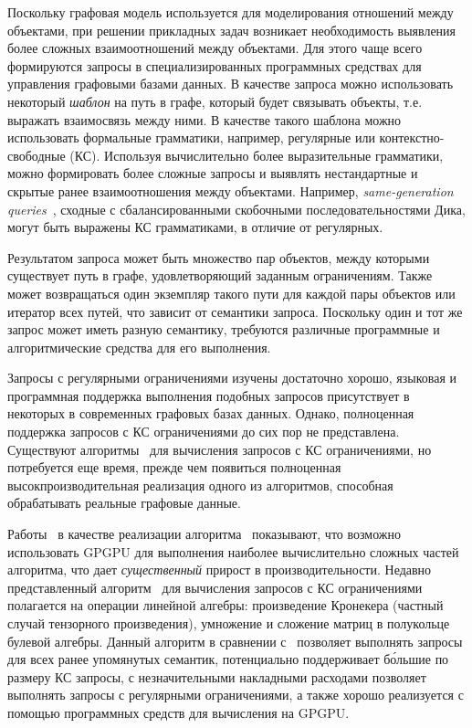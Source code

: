 \documentclass[14pt]{matmex-diploma-custom}
\begin{document}
Поскольку графовая модель используется для моделирования отношений между объектами, при решении прикладных задач возникает необходимость выявления более сложных взаимоотношений между объектами. Для этого чаще всего формируются запросы в специализированных программных средствах для управления графовыми базами данных. В качестве запроса можно использовать некоторый \textit{шаблон} на путь в графе, который будет связывать объекты, т.е. выражать взаимосвязь между ними. В качестве такого шаблона можно использовать формальные грамматики, например, регулярные или контекстно-свободные (КС). Используя вычислительно более выразительные грамматики, можно формировать более сложные запросы и выявлять нестандартные и скрытые ранее взаимоотношения между объектами. Например, \textit{same-generation queries}~\cite{inbook:databases_intro}, сходные с сбалансированными скобочными последовательностями Дика, могут быть выражены КС грамматиками, в отличие от регулярных.

Результатом запроса может быть множество пар объектов, между которыми существует путь в графе, удовлетворяющий заданным ограничениям. Также может возвращаться один экземпляр такого пути для каждой пары объектов или итератор всех путей, что зависит от семантики запроса. Поскольку один и тот же запрос может иметь разную семантику, требуются различные программные и алгоритмические средства для его выполнения.  

Запросы с регулярными ограничениями изучены достаточно хорошо, языковая и программная поддержка выполнения подобных запросов присутствует в некоторых в современных графовых базах данных. Однако, полноценная поддержка запросов с КС ограничениями до сих пор не представлена. Существуют алгоритмы~\cite{article:cfpq_and_rdf_analysis, article:hellings_cfpq, inproceedings:matrix_cfpq, inbook:kronecker_cfpq_adbis, article:cfpq_go_for_rdf} для вычисления запросов с КС ограничениями, но потребуется еще время, прежде чем появиться полноценная высокпроизводительная реализация одного из алгоритмов, способная обрабатывать реальные графовые данные.

Работы~\cite{inproceedings:cfpq_matrix_evaluation, inproceedings:cfqp_matrix_with_single_source} в качестве реализации алгоритма~\cite{inproceedings:matrix_cfpq} показывают, что возможно использовать GPGPU для выполнения наиболее вычислительно сложных частей алгоритма, что дает \textit{существенный} прирост в производительности. Недавно представленный алгоритм~\cite{inbook:kronecker_cfpq_adbis} для вычисления запросов с КС ограничениями полагается на операции линейной алгебры: произведение Кронекера (частный случай тензорного произведения), умножение и сложение матриц в полукольце булевой алгебры. Данный алгоритм в сравнении с~\cite{inproceedings:matrix_cfpq} позволяет выполнять запросы для всех ранее упомянутых семантик, потенциально поддерживает б\'ольшие по размеру КС запросы, с незначительными накладными расходами позволяет выполнять запросы с регулярными ограничениями, а также хорошо реализуется с помощью программных средств для вычисления на GPGPU.
\end{document}
